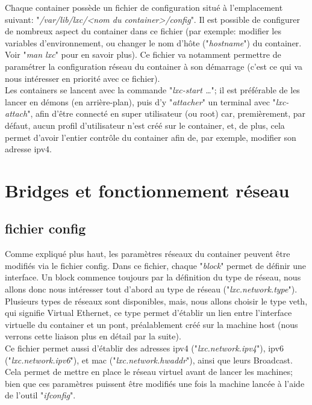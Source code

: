 \documentclass{article}
\begin{document}
Chaque container poss\`ede un fichier de configuration situ\'e \`a l'emplacement suivant: "\emph{/var/lib/lxc/<nom du container>/config}".
Il est possible de configurer de nombreux aspect du container dans ce fichier (par exemple: modifier
les variables d'environnement, ou changer le nom d'h\^ote ("\emph{hostname}") du container. Voir "\emph{man lxc}"
pour en savoir plus). Ce fichier va notamment permettre de param\'etrer la configuration r\'eseau du container
\`a son d\'emarrage (c'est ce qui va nous int\'eresser en priorit\'e avec ce fichier).\\

Les containers se lancent avec la commande "\emph{lxc-start …}"; il est pr\'ef\'erable de les lancer en d\'emons
(en arri\`ere-plan), puis d'y "\emph{attacher}" un terminal avec "\emph{lxc-attach}", afin d'\^etre connect\'e en super
utilisateur (ou root) car, premi\`erement, par d\'efaut, aucun profil d'utilisateur n'est cr\'e\'e sur le container,
et, de plus, cela permet d'avoir l'entier contr\^ole du container afin de, par exemple, modifier son adresse ipv4.\\


\section{Bridges et fonctionnement r\'eseau}
\subsection{fichier config}
Comme expliqu\'e plus haut, les param\`etres r\'eseaux du container peuvent \^etre modifi\'es via le fichier config.
Dans ce fichier, chaque "\emph{block}" permet de d\'efinir une interface. Un block commence toujours par la 
d\'efinition du type de r\'eseau, nous allons donc nous int\'eresser tout d'abord au type de r\'eseau ("\emph{lxc.network.type}").
Plusieurs types de r\'eseaux sont disponibles, mais, nous allons choisir le type veth, qui signifie Virtual 
Ethernet, ce type permet d'\'etablir un lien entre l'interface virtuelle du container et un pont, pr\'ealablement
cr\'e\'e sur la machine host (nous verrons cette liaison plus en d\'etail par la suite).\\

Ce fichier permet aussi d'\'etablir des adresses ipv4 ("\emph{lxc.network.ipv4}"), ipv6 ("\emph{lxc.network.ipv6}"),
et mac ("\emph{lxc.network.hwaddr}"), ainsi que leurs Broadcast. Cela permet de mettre en place le r\'eseau 
virtuel avant de lancer les machines; bien que ces param\`etres puissent \^etre modifi\'es une fois la machine
lanc\'ee \`a l'aide de l'outil "\emph{ifconfig}".\\
\end{document}
